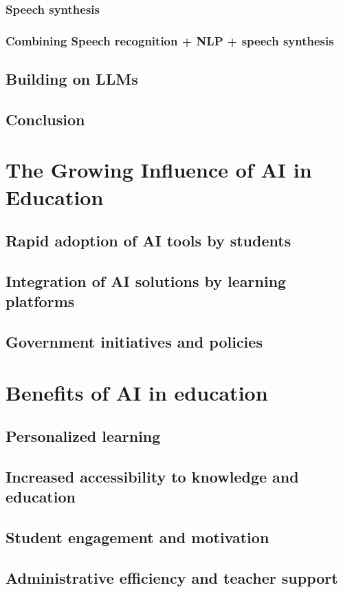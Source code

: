 \documentclass{article}
\begin{document}
\subsubsection{Speech synthesis}
\subsubsection{Combining Speech recognition + NLP + speech synthesis}
\subsection{Building on LLMs}
\subsection{Conclusion}
\section{The Growing Influence of AI in Education}
\subsection{Rapid adoption of AI tools by students}
\subsection{Integration of AI solutions by learning platforms}
\subsection{Government initiatives and policies}
\section{Benefits of AI in education}
\subsection{Personalized learning}
\subsection{Increased accessibility to knowledge and education}
\subsection{Student engagement and motivation}
\subsection{Administrative efficiency and teacher support}
\end{document}
